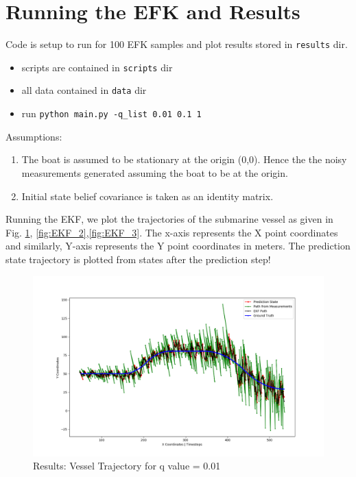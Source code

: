 \documentclass[12pt]{article}
\begin{document}
       
\section{Running the  EFK and Results}
Code is setup to run for 100 EFK samples and plot results stored in \texttt{results} dir.
\begin{itemize}
\item scripts are contained in \texttt{scripts} dir
\item all data contained in \texttt{data} dir
\item run \texttt{python main.py -q\_list 0.01 0.1 1}
\end{itemize}

Assumptions:
\begin{enumerate}
\item The boat is assumed to be stationary at the origin (0,0). Hence the the noisy measurements generated assuming the boat to be at the origin.
\item Initial state belief covariance is taken as an identity matrix.

\end{enumerate}
 
Running the EKF, we plot the trajectories of the submarine vessel as given in Fig. \ref{fig:EKF_1}, \ref{fig:EKF_2},\ref{fig:EKF_3}. The x-axis represents the X point coordinates and similarly,  Y-axis represents the Y point coordinates in meters. The prediction state trajectory is plotted from states after the prediction step!

  \begin{figure}[!h]
\centering
\includegraphics[width=\textwidth]{../results/path_q0_01.png}
\caption{Results: Vessel Trajectory for q value = 0.01}
\label{fig:EKF_1}
\end{figure}
\end{document}
